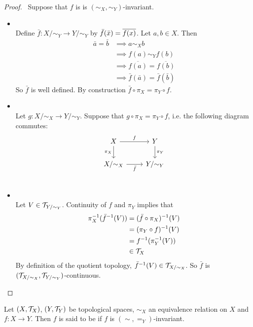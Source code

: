 \documentclass{book}
\begin{document}
	\begin{proof}\
	Suppose that $f$ is is $(\sim_X, \sim_Y)$-invariant. 
	\begin{itemize}
		\item {} \\
			Define $\bar{f}: X / {\sim_Y} \rightarrow Y/{\sim_Y}$ by $\bar{f}(\bar{x}) = \overline{f(x)}$. Let $a,b \in X$. Then 
		\begin{align*}
			\bar{a} = \bar{b}
			& \implies a \sim_X b \\
			& \implies f(a) \sim_Y f(b) \\
			& \implies \overline{f(a)} = \overline{f(b)} \\
			& \implies \bar{f}(\bar{a}) = \bar{f}(\bar{b}) 
		\end{align*}
		So $\bar{f}$ is well defined. By construction $\bar{f} \circ \pi_X = \pi_Y \circ f$.
		\item \tbf{Uniqueness:} \\
		Let $g: X / {\sim}_X \rightarrow Y/ {\sim_Y}$. Suppose that $g \circ \pi_X = \pi_Y \circ f$, i.e. the following diagram commutes:
		\[ 
		\begin{tikzcd}
			X  \arrow[r, "f"]  \arrow[d, "\pi_X"']  & Y   \arrow[d, "\pi_Y"]\\
			X/ {\sim_X} \arrow[r, "\bar{f}"'] &  Y / {\sim_Y} \\
		\end{tikzcd}
		\]
		\item  {} \\
		Let $V \in \mathcal{T}_{Y/ \sim_Y}$. Continuity of $f$ and $\pi_Y$ implies that 
		\begin{align*}
			\pi_X^{-1}(\bar{f}^{-1}(V))
			& = (\bar{f} \circ \pi_X)^{-1}(V) \\
			& = (\pi_Y \circ f)^{-1}(V) \\
			& = f^{-1}(\pi_Y^{-1}(V)) \\
			& \in \mathcal{T}_X
		\end{align*}
		By definition of the quotient topology, $\bar{f}^{-1}(V) \in \mathcal{T}_{X/ \sim_X}$. So $\bar{f}$ is $(\mathcal{T}_{X/ \sim_X}, \mathcal{T}_{Y/ \sim_Y})$-continuous.
	\end{itemize}
	\end{proof}

	\begin{defn}  
		Let $(X, \mathcal{T}_X)$, $(Y, \mathcal{T}_Y)$ be topological spaces, $\sim_X$ an equivalence relation on $X$ and $f : X \rightarrow Y $. Then $f$ is said to be  if $f$ is $(\sim, =_Y)$-invariant.
	\end{defn}
\end{document}
